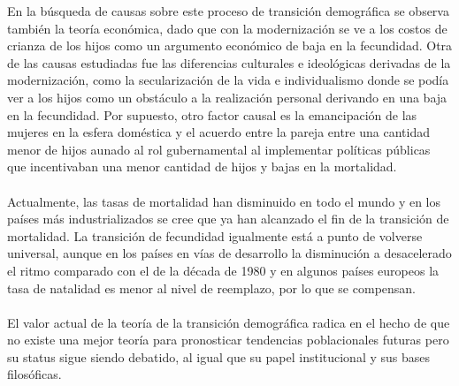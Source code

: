\documentclass[11pt,spanish,letterpaper]{article}
\theoremstyle{plain}
\begin{document}
En la b\'usqueda de causas sobre este proceso de transici\'on demogr\'afica se observa tambi\'en la teor\'ia econ\'omica, dado que con la modernizaci\'on se ve a los costos de crianza de los hijos como un argumento econ\'omico de baja en la fecundidad. Otra de las causas estudiadas fue las diferencias culturales e ideol\'ogicas derivadas de la modernizaci\'on, como la secularizaci\'on de la vida e individualismo donde se pod\'ia ver a los hijos como un obst\'aculo a la realizaci\'on personal derivando en una baja en la fecundidad. Por supuesto, otro factor causal es la emancipaci\'on de las mujeres en la esfera dom\'estica y el acuerdo entre la pareja entre una cantidad menor de hijos aunado al rol gubernamental al implementar pol\'iticas p\'ublicas que incentivaban una menor cantidad de hijos y bajas en la mortalidad.\\
\\
Actualmente, las tasas de mortalidad han disminuido en todo el mundo y en los pa\'ises m\'as industrializados se cree que ya han alcanzado el fin de la transici\'on de mortalidad. La transici\'on de fecundidad igualmente est\'a a punto de volverse universal, aunque en los pa\'ises en v\'ias de desarrollo la disminuci\'on a desacelerado el ritmo comparado con el de la d\'ecada de 1980 y en algunos pa\'ises europeos la tasa de natalidad es menor al nivel de reemplazo, por lo que se compensan.\\
\\
El valor actual de la teor\'ia de la transici\'on demogr\'afica radica en el hecho de que no existe una mejor teor\'ia para pronosticar tendencias poblacionales futuras pero su status sigue siendo debatido, al igual que su papel institucional y sus bases filos\'oficas.


\end{document}
